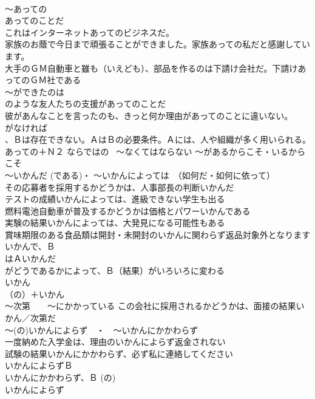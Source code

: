\documentclass[8pt]{extreport}
\begin{document}
\begin{CJK}{UTF8}{min}
\\	～あっての
\\	あってのことだ	
\\	これはインターネットあってのビジネスだ。 
\\	家族のお蔭で今日まで頑張ることができました。家族あっての私だと感謝しています。 
\\	大手のＧＭ自動車と雖も（いえども）、部品を作るのは下請け会社だ。下請けあってのＧＭ社である 
\\	～ができたのは
\\	のような友人たちの支援があってのことだ 
\\	彼があんなことを言ったのも、きっと何か理由があってのことに違いない。 
\\	がなければ 
\\	、Ｂは存在できない。ＡはＢの必要条件。Ａには、人や組織が多く用いられる。 
\\	あっての＋Ｎ２	ならではの~ ～なくてはならない ～があるからこそ・いるからこそ
\\	～いかんだ (である)・ ～いかんによっては　（如何だ・如何に依って）	
\\	その応募者を採用するかどうかは、人事部長の判断いかんだ 
\\	テストの成績いかんによっては、進級できない学生も出る 
\\	燃料電池自動車が普及するかどうかは価格とパワーいかんである 
\\	実験の結果いかんによっては、大発見になる可能性もある 
\\	賞味期限のある食品類は開封・未開封のいかんに関わらず返品対象外となります 
\\	いかんで、Ｂ 
\\	はＡいかんだ 
\\	がどうであるかによって、Ｂ（結果）がいろいろに変わる 
\\	いかん 
\\	（の）＋いかん 
\\	～次第　　～にかかっている この会社に採用されるかどうかは、面接の結果いかん／次第だ
\\	～(の)いかんによらず　・　～いかんにかかわらず	
\\	一度納めた入学金は、理由のいかんによらず返金されない 
\\	試験の結果いかんにかかわらず、必ず私に連絡してください 
\\	いかんによらずＢ　　
\\	いかんにかかわらず、Ｂ (の) 
\\	いかんによらず 

\end{CJK}
\end{document}

